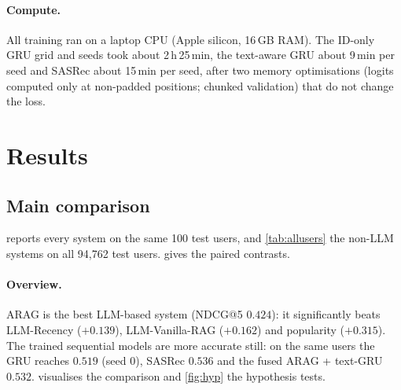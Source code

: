 \documentclass[11pt,a4paper]{article}
\begin{document}
\paragraph{Compute.} All training ran on a laptop CPU (Apple silicon, 16\,GB RAM). The ID-only GRU
grid and seeds took about 2\,h\,25\,min, the text-aware GRU about 9\,min per seed and SASRec about
15\,min per seed, after two memory optimisations (logits computed only at non-padded positions;
chunked validation) that do not change the loss.

\section{Results}
\label{sec:results}

\subsection{Main comparison}

 reports every system on the same 100 test users, and \cref{tab:allusers} the
non-LLM systems on all 94{,}762 test users.  gives the paired contrasts.

\begin{table}[htbp]
\centering
\caption{All systems on the same 100 sampled test users (best value per column in bold).
Trained models are shown per seed. Standard deviations across users are about 0.4--0.5 for Hit
and 0.3--0.45 for NDCG; see \cref{tab:paired} for paired confidence intervals.}
\label{tab:main}
\small

\end{table}

\begin{table}[htbp]
\centering
\caption{Non-LLM systems on all 94{,}762 test users (mean $\pm$ standard deviation over three
seeds for the GRUs).}
\label{tab:allusers}

\end{table}

\begin{table}[htbp]
\centering
\caption{Paired bootstrap contrasts on the same 100 test users ($\Delta$NDCG@5, 95\% CI,
10{,}000 resamples). GRU and text-aware GRU refer to seed 0 unless stated. H1$'$/H2$'$ repeat
H1/H2 with the text-aware GRU.}
\label{tab:paired}
\small

\end{table}

\paragraph{Overview.} ARAG is the best LLM-based system (NDCG@5 $0.424$): it significantly beats
LLM-Recency ($+0.139$), LLM-Vanilla-RAG ($+0.162$) and popularity ($+0.315$). The trained
sequential models are more accurate still: on the same users the GRU reaches $0.519$ (seed 0),
SASRec $0.536$ and the fused ARAG + text-GRU $0.532$.  visualises the comparison
and \cref{fig:hyp} the hypothesis tests.
\end{document}
